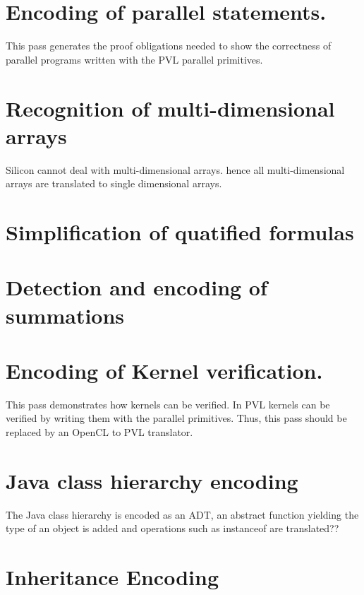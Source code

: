 \section{Encoding of parallel statements.}

This pass generates the proof obligations needed to show 
the correctness of parallel programs written with the
PVL parallel primitives.

\section{Recognition of multi-dimensional arrays}

Silicon cannot deal with multi-dimensional arrays.
hence all multi-dimensional arrays are translated to single dimensional arrays.

\section{Simplification of quatified formulas}

\section{Detection and encoding of summations}

\section{Encoding of Kernel verification.}

This pass demonstrates how kernels can be verified.
In PVL kernels can be verified by writing them with
the parallel primitives. Thus, this pass should be replaced
by an OpenCL to PVL translator.

\section{Java class hierarchy encoding}

The Java class hierarchy is encoded as an ADT, an abstract function yielding
the type of an object is added and operations such as instanceof are
translated??



\section{Inheritance Encoding}

